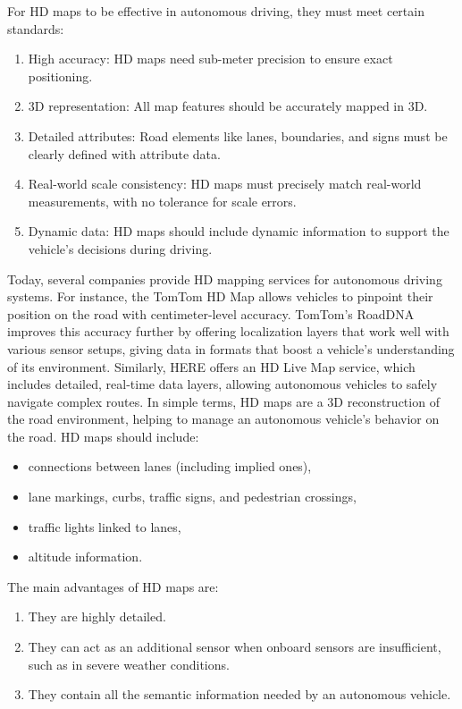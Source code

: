 For HD maps to be effective in autonomous driving, they must meet certain standards:
\begin{enumerate}
    \item High accuracy: HD maps need sub-meter precision to ensure exact positioning.
    \item 3D representation: All map features should be accurately mapped in 3D.
    \item Detailed attributes: Road elements like lanes, boundaries, and signs must be clearly defined with attribute data.
    \item Real-world scale consistency: HD maps must precisely match real-world measurements, with no tolerance for scale errors.
    \item Dynamic data: HD maps should include dynamic information to support the vehicle’s decisions during driving.
\end{enumerate}

Today, several companies provide HD mapping services for autonomous driving systems. For instance, the TomTom HD Map allows vehicles to pinpoint their position on the road with centimeter-level accuracy. TomTom’s RoadDNA improves this accuracy further by offering localization layers that work well with various sensor setups, giving data in formats that boost a vehicle’s understanding of its environment. Similarly, HERE offers an HD Live Map service, which includes detailed, real-time data layers, allowing autonomous vehicles to safely navigate complex routes.
In simple terms, HD maps are a 3D reconstruction of the road environment, helping to manage an autonomous vehicle’s behavior on the road. HD maps should include:
\begin{itemize}
    \item connections between lanes (including implied ones),
    \item lane markings, curbs, traffic signs, and pedestrian crossings,
    \item traffic lights linked to lanes,
    \item altitude information.
\end{itemize}
The main advantages of HD maps are:
\begin{enumerate}
    \item They are highly detailed.
    \item They can act as an additional sensor when onboard sensors are insufficient, such as in severe weather conditions.
    \item They contain all the semantic information needed by an autonomous vehicle.
\end{enumerate}

